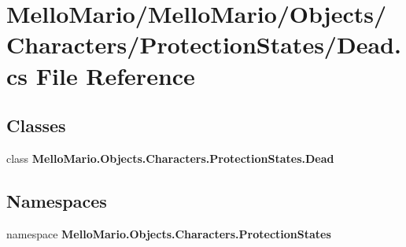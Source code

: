 \section{Mello\+Mario/\+Mello\+Mario/\+Objects/\+Characters/\+Protection\+States/\+Dead.cs File Reference}
\label{Dead_8cs}
\subsection*{Classes}
\begin{DoxyCompactItemize}
\item 
class \textbf{ Mello\+Mario.\+Objects.\+Characters.\+Protection\+States.\+Dead}
\end{DoxyCompactItemize}
\subsection*{Namespaces}
\begin{DoxyCompactItemize}
\item 
namespace \textbf{ Mello\+Mario.\+Objects.\+Characters.\+Protection\+States}
\end{DoxyCompactItemize}
